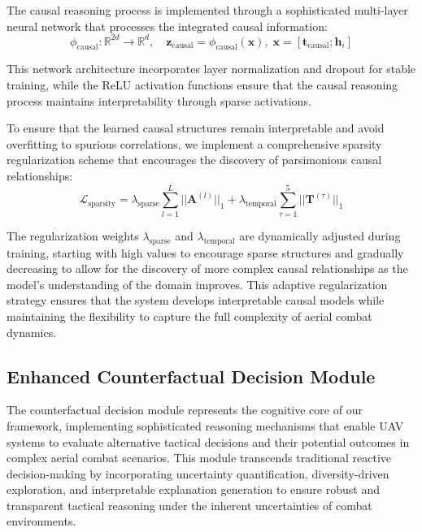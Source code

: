 \documentclass[12pt]{article}
\begin{document}
The causal reasoning process is implemented through a sophisticated multi-layer neural network that processes the integrated causal information:
\begin{equation}
\phi_{\mathrm{causal}}:\mathbb{R}^{2d}\to\mathbb{R}^{d},\quad
\mathbf{z}_{\mathrm{causal}} = \phi_{\mathrm{causal}}(\mathbf{x}),\; \mathbf{x}=[\mathbf{t}_{\mathrm{causal}};\mathbf{h}_i]
\end{equation}

This network architecture incorporates layer normalization and dropout for stable training, while the ReLU activation functions ensure that the causal reasoning process maintains interpretability through sparse activations.

To ensure that the learned causal structures remain interpretable and avoid overfitting to spurious correlations, we implement a comprehensive sparsity regularization scheme that encourages the discovery of parsimonious causal relationships:
\begin{equation}
\mathcal{L}_{\text{sparsity}} = \lambda_{\text{sparse}} \sum_{l=1}^{L} ||\mathbf{A}^{(l)}||_1 + \lambda_{\text{temporal}} \sum_{\tau=1}^{5} ||\mathbf{T}^{(\tau)}||_1
\end{equation}

The regularization weights $\lambda_{\text{sparse}}$ and $\lambda_{\text{temporal}}$ are dynamically adjusted during training, starting with high values to encourage sparse structures and gradually decreasing to allow for the discovery of more complex causal relationships as the model's understanding of the domain improves. This adaptive regularization strategy ensures that the system develops interpretable causal models while maintaining the flexibility to capture the full complexity of aerial combat dynamics.

\subsection{Enhanced Counterfactual Decision Module}

The counterfactual decision module represents the cognitive core of our framework, implementing sophisticated reasoning mechanisms that enable UAV systems to evaluate alternative tactical decisions and their potential outcomes in complex aerial combat scenarios. This module transcends traditional reactive decision-making by incorporating uncertainty quantification, diversity-driven exploration, and interpretable explanation generation to ensure robust and transparent tactical reasoning under the inherent uncertainties of combat environments.
\end{document}
